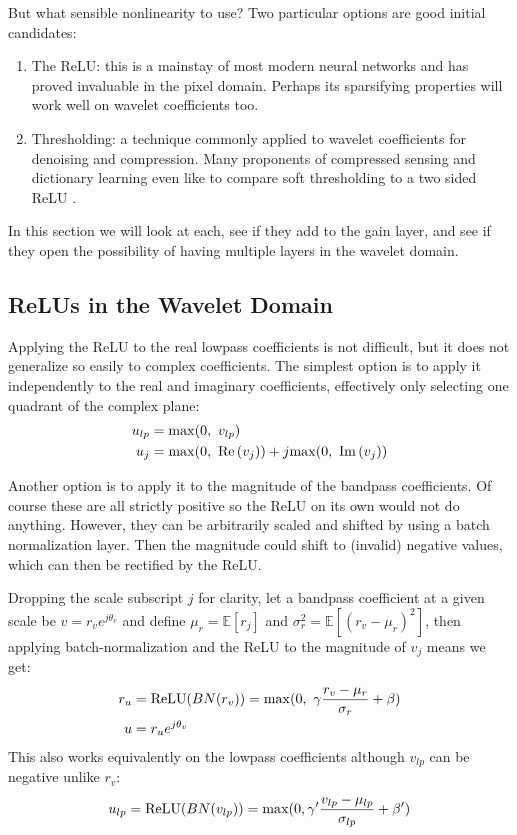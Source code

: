 But what sensible nonlinearity to use? Two particular options are good initial
candidates:
\begin{enumerate}
  \item The ReLU: this is a mainstay of most modern neural networks and has
    proved invaluable in the pixel domain. Perhaps its sparsifying properties
    will work well on wavelet coefficients too. 
  \item Thresholding: a technique commonly applied to wavelet
    coefficients for denoising and compression. Many proponents of compressed
    sensing and dictionary learning even like to compare soft thresholding to a
    two sided ReLU \cite{papyan_theoretical_2018, papyan_convolutional_2016}.
\end{enumerate}

In this section we will look at each, see if they add to the gain
layer, and see if they open the possibility of having multiple layers in the
wavelet domain. 

\subsection{ReLUs in the Wavelet Domain}
Applying the ReLU to the real lowpass coefficients is not difficult, but it does
not generalize so easily to complex coefficients. The simplest option is to apply
it independently to the real and imaginary coefficients, effectively only
selecting one quadrant of the complex plane:
\begin{align}
  u_{lp} &= \mathrm{max}(0,\ v_{lp}) \\
  u_{j} &= \mathrm{max}(0,\ \mathrm{Re}\left(v_{j}\right)) + j\mathrm{max}(0,\ \mathrm{Im}\left(v_j\right)) \label{eq:ch6:relu_bp}
\end{align}

Another option is to apply it to the magnitude of the bandpass coefficients. Of
course these are all strictly positive so the ReLU on its own would not do
anything. However, they can be arbitrarily scaled and shifted by using a batch
normalization layer. Then the magnitude could shift to (invalid) negative
values, which can then be rectified by the ReLU. 

Dropping the scale
subscript $j$ for clarity, let a bandpass coefficient at a given scale be
$v = r_v e^{j\theta_v}$ and define
$\mu_r = \mathbb{E}[r_j]$ and $\sigma_r^2 = \mathbb{E}[(r_v-\mu_r)^2]$, then
applying batch-normalization and the ReLU to the magnitude of $v_j$ means we
get:
\begin{align}
  r_u &= \mathrm{ReLU}(BN(r_v)) = \max(0,\ \gamma \frac{r_v-\mu_r}{\sigma_r} + \beta) \label{eq:ch6:magrelu_bp} \\
  u &= r_u e^{j\theta_v} \label{eq:ch6:magrelu_bp2} 
\end{align}
This also works equivalently on the lowpass coefficients although $v_{lp}$ can
be negative unlike $r_v$:
\begin{equation}
  u_{lp} = \mathrm{ReLU}(BN(v_{lp})) = \max(0, \gamma' \frac{v_{lp} - \mu_{lp}}{\sigma_{lp}} + \beta') \label{eq:ch6:bnrelu_lp}
\end{equation}
%
